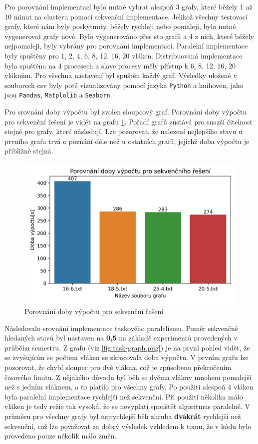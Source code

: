 Pro porovnání implementací bylo nutné vybrat alespoň 3 grafy, které běžely 1 až 10 minut na clusteru pomocí sekvenční implementace.
Jelikož všechny testovací grafy, které nám byly poskytnuty, běžely rychleji nebo pomaleji, bylo nutné vygenerovat grafy nové.
Bylo vygenerováno přes sto grafů a 4 z nich, které běžely nejpomaleji, byly vybrány pro porovnání implementací.
Paralelní implementace byly spuštěny pro 1, 2, 4, 6, 8, 12, 16, 20 vláken.
Distribuovaná implementace byla spuštěna na 4 procesech a slave procesy měly přístup k 6, 8, 12, 16, 20 vláknům.
Pro všechna nastavení byl spuštěn každý graf.
Výsledky uložené v souborech csv byly poté vizualizovány pomocí jazyka \texttt{Python} a knihoven, jako jsou \texttt{Pandas}, \texttt{Matplolib} a \texttt{Seaborn}.

Pro srovnání doby výpočtu byl zvolen sloupcový graf.
Porovnání doby výpočtu pro sekvenční řešení je vidět na grafu \ref{fig:seq-graph.png}.
Pořadí grafů zůstává pro snazší čitelnost stejné pro grafy, které následují.
Lze pozorovat, že nalezení nejlepšího stavu u prvního grafu trvá o poznání déle než u ostatních grafů, jejichž doba výpočtu je přibližně stejná.

\begin{figure}[!htbp]
\centerline{\includegraphics[scale=0.56]{report/images/seq-graph.png}}
\caption{Porovnání doby výpočtu pro sekvenční řešení}
\label{fig:seq-graph.png}
\end{figure}
\FloatBarrier

Následovalo srovnání implementace taskového paralelismu.
Poměr sekvenčně hledaných stavů byl nastaven na \textbf{0,5} na základě experimentů provedených v průběhu semestru.
Z grafu (viz \ref{fig:task-graph.png}) je na první pohled vidět, že se zvyšujícím se počtem vláken se zkracovala doba výpočtu.
V prvním grafu lze pozorovat, že chybí sloupec pro dvě vlákna, což je způsobeno překročením časového limitu.
Z nějakého důvodu byl běh se dvěma vlákny mnohem pomalejší než s jedním vláknem, a to platilo pro všechny grafy.
Po použití alespoň 4 vláken byla paralelní implementace rychlejší než sekvenční.
Při použití několika málo vláken je tedy režie tak vysoká, že se nevyplatí spouštět algoritmus paralelně.
V průměru pro všechny grafy byl nejrychlejší běh zhruba \textbf{dvakrát} rychlejší než sekvenční, což lze považovat za dobrý výsledek vzhledem k tomu, že v kódu bylo provedeno pouze několik málo změn.

